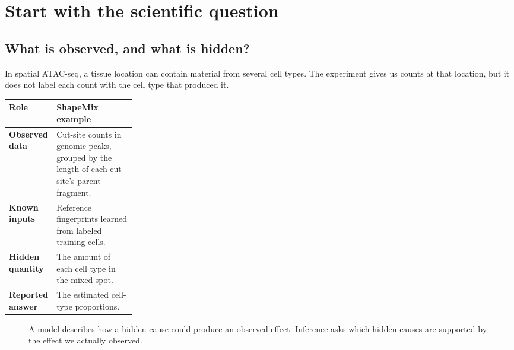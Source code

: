 \documentclass[11pt]{article}
\newcommand{\term}[1]{\textbf{\color{tealdark}#1}}
\begin{document}
\section{Start with the scientific question}

\subsection{What is observed, and what is hidden?}

In spatial ATAC-seq, a tissue location can contain material from several cell
types. The experiment gives us counts at that location, but it does not label each
count with the cell type that produced it.

\begin{center}
\begin{tabularx}{0.92\linewidth}{L{0.25\linewidth}X}
\toprule
Role & ShapeMix example \\
\midrule
\term{Observed data} & Cut-site counts in genomic peaks, grouped by the length of each cut site's parent fragment. \\
\term{Known inputs} & Reference fingerprints learned from labeled training cells. \\
\term{Hidden quantity} & The amount of each cell type in the mixed spot. \\
\term{Reported answer} & The estimated cell-type proportions. \\
\bottomrule
\end{tabularx}
\end{center}

\begin{figure}[H]
\centering
{}
\caption{A model describes how a hidden cause could produce an observed effect. Inference asks which hidden causes are supported by the effect we actually observed.}
\end{figure}
\end{document}
